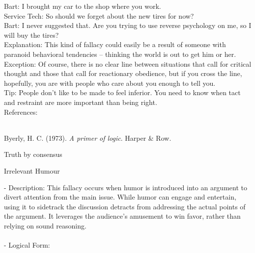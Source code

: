 \documentclass[a4paper,12pt,single,pdftex]{scrartcl}
\begin{document}
    
      Bart: I brought my car to the shop where you work.
    \\

    
      Service Tech: So should we forget about the new tires for now?
    \\

    
      Bart: I never suggested that.  Are you trying to use reverse psychology on me, so I will buy the tires?
    \\

    
      Explanation: This kind of fallacy could easily be a result of someone with paranoid behavioral tendencies -- thinking the world is out to get him or her.
    \\

    
      Exception: Of course, there is no clear line between situations that call for critical thought and those that call for reactionary obedience, but if you cross the line, hopefully, you are with people who care about you enough to tell you.
    \\

    
      Tip: People don’t like to be made to feel inferior.  You need to know when tact and restraint are more important than being right.
    \\

    References:

    
      
        
      \\

      
        
          Byerly, H. C. (1973). {\it A primer of logic}. Harper \& Row.
        
      
    
  

Truth by consensus

Irrelevant Humour
    
      - Description: This fallacy occurs when humor is introduced into an argument to divert attention from the main issue. While humor can engage and entertain, using it to sidetrack the discussion detracts from addressing the actual points of the argument. It leverages the audience's amusement to win favor, rather than relying on sound reasoning.
    \\

    
      
    \\

    
      - Logical Form:
    \\
\end{document}
